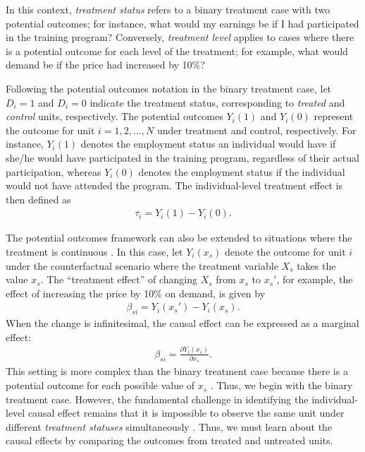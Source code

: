 In this context, \textit{treatment status} refers to a binary treatment case with two potential outcomes; for instance, what would my earnings be if I had participated in the training program? Conversely, \textit{treatment level} applies to cases where there is a potential outcome for each level of the treatment; for example, what would demand be if the price had increased by 10\%?

Following the potential outcomes notation in the binary treatment case, let $D_i = 1$ and $D_i = 0$ indicate the treatment status, corresponding to \textit{treated} and \textit{control} units, respectively. The potential outcomes $Y_i(1)$ and $Y_i(0)$ represent the outcome for unit $i = 1, 2, \dots, N$ under treatment and control, respectively. For instance, $Y_i(1)$ denotes the employment status an individual would have if she/he would have participated in the training program, regardless of their actual participation, whereas $Y_i(0)$ denotes the employment status if the individual would not have attended the program. The individual-level treatment effect is then defined as
\begin{align*}
	\tau_i = Y_i(1) - Y_i(0).
\end{align*}

The potential outcomes framework can also be extended to situations where the treatment is continuous \cite{imbens2014ivperspective}. In this case, let $Y_i(x_s)$ denote the outcome for unit $i$ under the counterfactual scenario where the treatment variable $X_s$ takes the value $x_s$. The ``treatment effect'' of changing $X_s$ from $x_s$ to $x_s'$, for example, the effect of increasing the price by 10\% on demand, is given by
\begin{align*}
	\beta_{si} = Y_i(x_s') - Y_i(x_s).
\end{align*}
When the change is infinitesimal, the causal effect can be expressed as a marginal effect:
\begin{align*}
	\beta_{si} =\frac{\partial Y_i(x_s)}{\partial x_s}.
\end{align*}
This setting is more complex than the binary treatment case because there is a potential outcome for each possible value of $x_s$ \cite{gill2001causal}. Thus, we begin with the binary treatment case. However, the fundamental challenge in identifying the individual-level causal effect remains that it is impossible to observe the same unit under different \textit{treatment statuses} simultaneously \cite{angrist2009mostly}. Thus, we must learn about the causal effects by comparing the outcomes from treated and untreated units.

